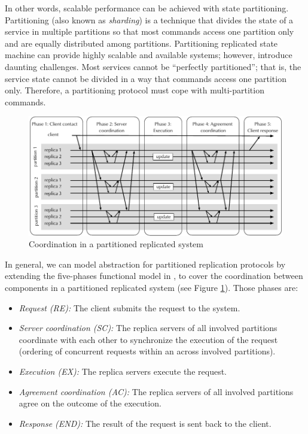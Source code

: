 In other words, scalable performance can be achieved with state partitioning.
Partitioning (also known as \emph{sharding}) is a technique that divides the
state of a service in multiple partitions so that most commands access one
partition only and are equally distributed among partitions. Partitioning
replicated state machine can provide highly scalable and available systems;
however, introduce daunting challenges. Most services cannot be ``perfectly
partitioned''; that is, the service state cannot be divided in a way that
commands access one partition only. Therefore, a partitioning protocol must cope
with multi-partition commands.

\begin{figure}
  \begin{minipage}[b]{1.0\linewidth}
  \centering
        \includegraphics[width=1\linewidth]{figures/replication-coordination}
  \end{minipage}
  \caption{Coordination in a partitioned replicated system}
  \label{fig:replication:coordination}
\end{figure}

In general, we can model abstraction for partitioned replication protocols by
extending the five-phases functional model in \cite{pedone:replication}, to
cover the coordination between components in a partitioned replicated system
(see Figure \ref{fig:replication:coordination}). Those phases are:
\begin{itemize}
  \item \textit{Request (RE):} The client submits the request to the system.
  \item \textit{Server coordination (SC):} The replica servers of all involved
  partitions coordinate with each other to synchronize the execution of the
  request (ordering of concurrent requests within an across involved partitions).
  \item \textit{Execution (EX):} The replica servers execute the request.
  \item \textit{Agreement coordination (AC):} The replica servers of all involved
  partitions agree on the outcome of the execution.
  \item \textit{Response (END):} The result of the request is sent back to the client.
\end{itemize}

